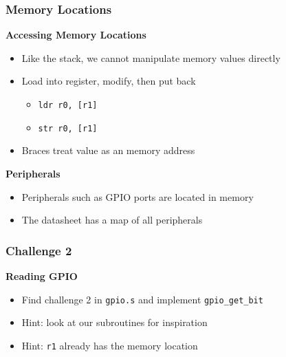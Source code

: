 \documentclass{beamer}
\begin{document}
\begin{frame}
	\frametitle{Memory Locations}
	\textbf{Accessing Memory Locations}
    \begin{itemize}
		\item Like the stack, we cannot manipulate memory values directly
		\item Load into register, modify, then put back
		\begin{itemize}
			\item \texttt{ldr r0, [r1]}
			\item \texttt{str r0, [r1]}
		\end{itemize}
		\item Braces treat value as an memory address
    \end{itemize}
	\textbf{Peripherals}
	\begin{itemize}
		\item Peripherals such as GPIO ports are located in memory
		\item The datasheet has a map of all peripherals
	\end{itemize}
\end{frame}

\begin{frame}
	\frametitle{Challenge 2}
	\textbf{Reading GPIO}
	\begin{itemize}
		\item Find challenge 2 in \texttt{gpio.s} and implement \texttt{gpio\_get\_bit}
		\item Hint: look at our subroutines for inspiration
		\item Hint: \texttt{r1} already has the memory location
	\end{itemize}
\end{frame}
\end{document}

